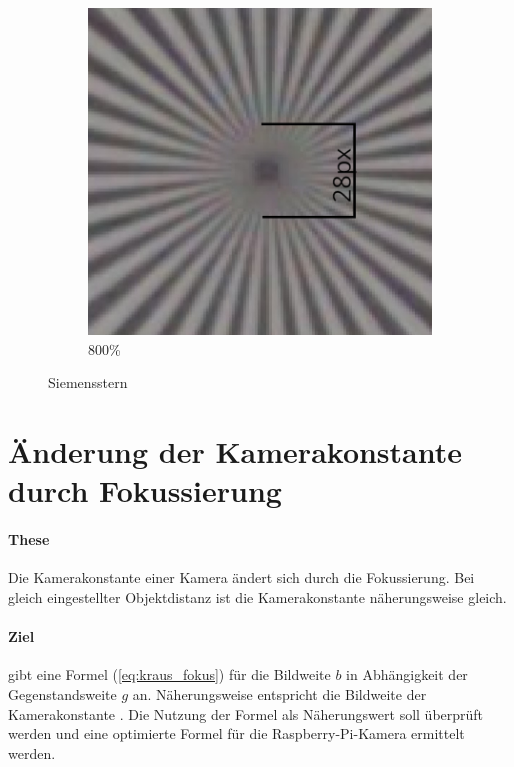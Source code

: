 \documentclass[./00PhotoBox.tex]{subfiles}
\begin{document}
\begin{figure}
\begin{subfigure}{0.45\textwidth}
        \includegraphics[height=0.9\linewidth]{./img/4_voruntersuchung/siemens_beschriftet.jpg}
        \centering
        \caption{800\%}
        \label{img:siemens_beschriftet}
    \end{subfigure}
    \caption{Siemensstern}
\end{figure}


\section{Änderung der Kamerakonstante durch Fokussierung}
\label{sec:fokus}

\paragraph{These}
Die \Gls{Kamerakonstante} einer Kamera ändert sich durch die Fokussierung. Bei gleich eingestellter Objektdistanz ist die \Gls{Kamerakonstante} näherungsweise gleich.

\paragraph{Ziel}
\citet[S. 59]{kraus} gibt eine Formel (\autoref{eq:kraus_fokus}) für die \Gls{Bildweite} $b$ in Abhängigkeit der Gegenstandsweite $g$ an. Näherungsweise entspricht die \Gls{Bildweite} der \Gls{Kamerakonstante} \citep[S. 59]{kraus}. Die Nutzung der Formel als Näherungswert soll überprüft werden und eine optimierte Formel für die Raspberry-Pi-Kamera ermittelt werden.
\end{document}
